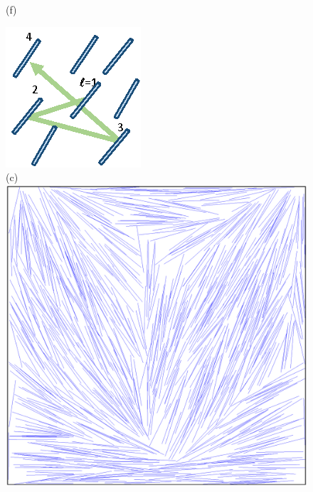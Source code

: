 \begin{figure}[!t]
\begin{minipage}[t]{0.25\textwidth}
		(f)
	\end{minipage}%
	\begin{minipage}[t]{0.25\textwidth}
		\centering
		\includegraphics[width=0.9\columnwidth]{./figs/FIG1C.eps}\\
		(c)\\ \vspace{0.5cm}
		\includegraphics[width=0.9\columnwidth]{./figs/FIG1G.eps}\\

\end{minipage}
\end{figure}
